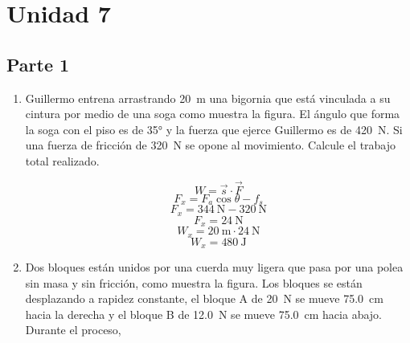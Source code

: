 \documentclass[Física - Práctica.root.tex]{subfiles}
\begin{document}
\section{Unidad 7}
\subsection{Parte 1}
\begin{enumerate}
  \item
        \begin{multicols}{2}
          Guillermo entrena arrastrando \SI{20}{\meter} una bigornia que
          está vinculada a su cintura por medio de una soga como
          muestra la figura. El ángulo que forma la soga con el piso es
          de \ang{35} y la fuerza que ejerce Guillermo es de \SI{420}{\newton}. Si una
          fuerza de fricción de \SI{320}{\newton} se opone al movimiento.
          Calcule el trabajo total realizado. \\
          \begin{center}
          \end{center}
        \end{multicols}
        \begin{center}
          \[ W = \vec{s}\cdot\vec{F} \]
          \[ F_x = F_a\cos\theta - f_s \]
          \[ F_x = \SI{344}{\newton} - \SI{320}{\newton} \]
          \[ F_x = \SI{24}{\newton} \]
          \[ W_x = \SI{20}{\meter}\cdot\SI{24}{\newton} \]
          \[ \boxed{W_x = \SI{480}{\joule}} \]
        \end{center}

  \item
        \begin{multicols}{2}
          Dos bloques están unidos por una cuerda muy ligera que pasa por una polea sin masa y
          sin fricción, como muestra la figura. Los bloques se están desplazando a rapidez
          constante, el bloque A de \SI{20}{\newton} se mueve \SI{75,0}{\centi\meter} hacia la derecha y
          el bloque B de \SI{12,0}{\newton} se mueve \SI{75,0}{\centi\meter} hacia abajo. Durante el proceso, \\


\end{multicols}
\end{enumerate}
\end{document}
